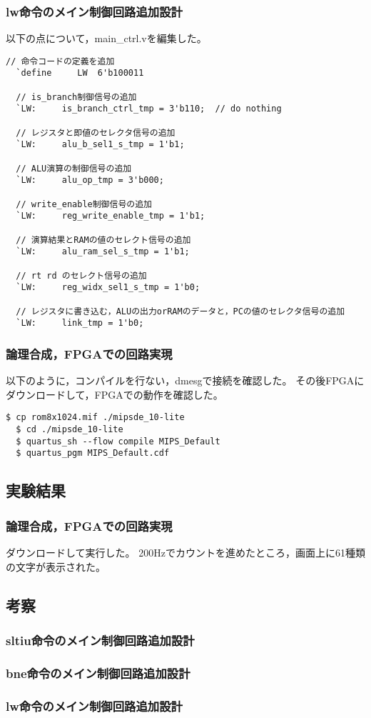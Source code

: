 \subsubsection{lw命令のメイン制御回路追加設計}
以下の点について，main\_ctrl.vを編集した。
\begin{lstlisting}[caption={lw命令の追加設計},label={lw命令の追加設計}]
  // 命令コードの定義を追加
  `define     LW  6'b100011

  // is_branch制御信号の追加
  `LW:     is_branch_ctrl_tmp = 3'b110;  // do nothing
  
  // レジスタと即値のセレクタ信号の追加
  `LW:     alu_b_sel1_s_tmp = 1'b1;

  // ALU演算の制御信号の追加
  `LW:     alu_op_tmp = 3'b000;

  // write_enable制御信号の追加
  `LW:     reg_write_enable_tmp = 1'b1;

  // 演算結果とRAMの値のセレクト信号の追加
  `LW:     alu_ram_sel_s_tmp = 1'b1;

  // rt rd のセレクト信号の追加
  `LW:     reg_widx_sel1_s_tmp = 1'b0;

  // レジスタに書き込む，ALUの出力orRAMのデータと，PCの値のセレクタ信号の追加
  `LW:     link_tmp = 1'b0;
\end{lstlisting}

\subsubsection{論理合成，FPGAでの回路実現}
以下のように，コンパイルを行ない，dmesgで接続を確認した。
その後FPGAにダウンロードして，FPGAでの動作を確認した。

\begin{lstlisting}[caption={コンパイル，ダウンロード},label={コンパイル，ダウンロード4-2}]
  $ cp rom8x1024.mif ./mipsde_10-lite
  $ cd ./mipsde_10-lite
  $ quartus_sh --flow compile MIPS_Default
  $ quartus_pgm MIPS_Default.cdf 
\end{lstlisting}

\subsection{実験結果}
\subsubsection{論理合成，FPGAでの回路実現}
ダウンロードして実行した。
200Hzでカウントを進めたところ，画面上に61種類の文字が表示された。

\subsection{考察}
\subsubsection{sltiu命令のメイン制御回路追加設計}

\subsubsection{bne命令のメイン制御回路追加設計}

\subsubsection{lw命令のメイン制御回路追加設計}
